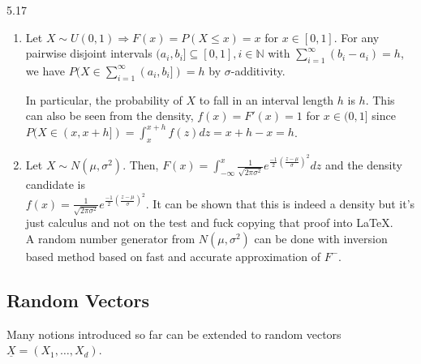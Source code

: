 \documentclass{article}
\newcommand{\N}{\mathbb{N}}
\begin{document}
	\begin{myex}{}{5.17}
		\begin{enumerate}
			\item Let $X\sim U(0, 1)\Rightarrow F(x)=P(X\leq x)=x$ for $x\in[0, 1]$. For any pairwise disjoint intervals $(a_i, b_i]\subseteq[0, 1], i\in\N$ with $\sum_{i=1}^{\infty}(b_i-a_i)=h$, we have $P(X\in\sum_{i=1}^{\infty}(a_i, b_i])=h$ by $\sigma$-additivity.
			
			In particular, the probability of $X$ to fall in an interval length $h$ is $h$. This can also be seen from the density, $f(x)=F'(x)=1$ for $x\in(0, 1]$ since $P(X\in(x, x+h])=\int_x^{x+h}f(z)dz=x+h-x=h$.
			
			\item Let $X\sim N(\mu, \sigma^2)$. Then, $F(x)=\int_{-\infty}^x\frac{1}{\sqrt{2\pi\sigma^2}}e^{\frac{-1}{2}(\frac{z-\mu}{\sigma})^2}dz$ and the density candidate is\\
			$f(x)=\frac{1}{\sqrt{2\pi\sigma^2}}e^{\frac{-1}{2}(\frac{z-\mu}{\sigma})^2}$. It can be shown that this is indeed a density but it's just calculus and not on the test and fuck copying that proof into \LaTeX.\\
			
			A random number generator from $N(\mu, \sigma^2)$ can be done with inversion based method based on fast and accurate approximation of $F^-$.
		\end{enumerate}
	\end{myex}	
	
	\subsection{Random Vectors}
	Many notions introduced so far can be extended to random vectors $\underline{X}=(X_1, \dots, X_d)$.
	
\end{document}
